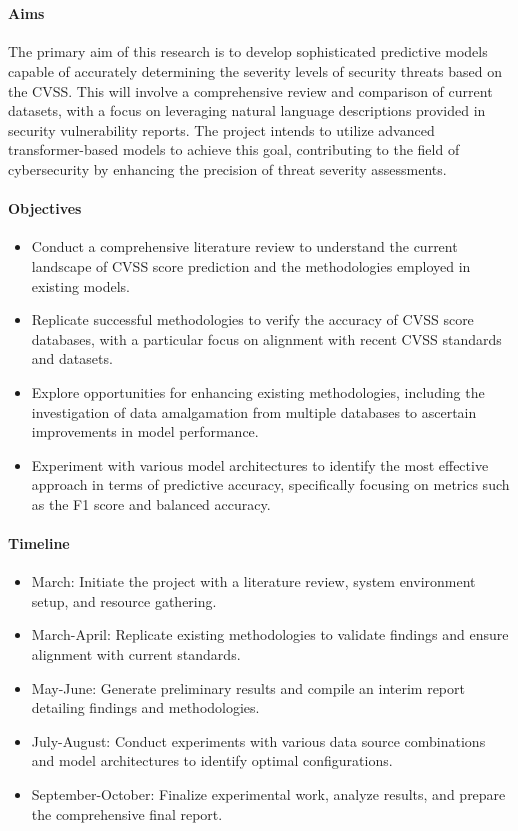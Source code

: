 \documentclass[11pt]{article}
\begin{document}
 \\

\paragraph{Aims}
The primary aim of this research is to develop sophisticated predictive models capable of accurately determining
the severity levels of security threats based on the CVSS. This will involve a comprehensive review and comparison 
of current datasets, with a focus on leveraging natural language descriptions provided in security vulnerability reports. 
The project intends to utilize advanced transformer-based models to achieve this goal, contributing to the field of 
cybersecurity by enhancing the precision of threat severity assessments.

\paragraph{Objectives}
\begin{itemize}[noitemsep]
    \item Conduct a comprehensive literature review to understand the current landscape of CVSS score prediction and the methodologies employed in existing models.
    \item Replicate successful methodologies to verify the accuracy of CVSS score databases, with a particular focus on alignment with recent CVSS standards and datasets.
    \item Explore opportunities for enhancing existing methodologies, including the investigation of data amalgamation from multiple databases to ascertain improvements in model performance.
    \item Experiment with various model architectures to identify the most effective approach in terms of predictive accuracy, specifically focusing on metrics such as the F1 score and balanced accuracy.
\end{itemize}

\paragraph{Timeline} 
\begin{itemize}[noitemsep]
    \item March: Initiate the project with a literature review, system environment setup, and resource gathering.
    \item March-April: Replicate existing methodologies to validate findings and ensure alignment with current standards.
    \item May-June: Generate preliminary results and compile an interim report detailing findings and methodologies.
    \item July-August: Conduct experiments with various data source combinations and model architectures to identify optimal configurations.
    \item September-October: Finalize experimental work, analyze results, and prepare the comprehensive final report.
\end{itemize}

\noindent
\end{document}
